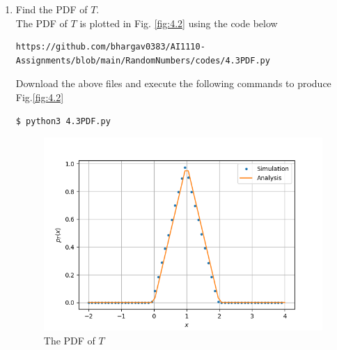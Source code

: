 \documentclass[journal,12pt,twocolumn]{IEEEtran}
\renewcommand\thesection{\arabic{section}}
\begin{document}
\begin{enumerate}[label=\thesection.\arabic*
,ref=\thesection.\theenumi]
Download the above files and execute the following commands to produce Fig.\ref{fig:4.2}
\begin{lstlisting}
$ python3 4.2CDF.py
\end{lstlisting}


\item Find the PDF of $T$.\\
\solution The PDF of $T$ is plotted in Fig. \ref{fig:4.2} using the code below
\begin{lstlisting}
https://github.com/bhargav0383/AI1110-Assignments/blob/main/RandomNumbers/codes/4.3PDF.py
\end{lstlisting}
Download the above files and execute the following commands to produce Fig.\ref{fig:4.2}
\begin{lstlisting}
$ python3 4.3PDF.py
\end{lstlisting}
\begin{figure}[!h]
\centering
\includegraphics[width=\columnwidth]{./figs/4.3PDF.png}
\caption{The PDF of $T$}
\label{fig:4.3}
\end{figure}


\end{enumerate}
\end{document}

